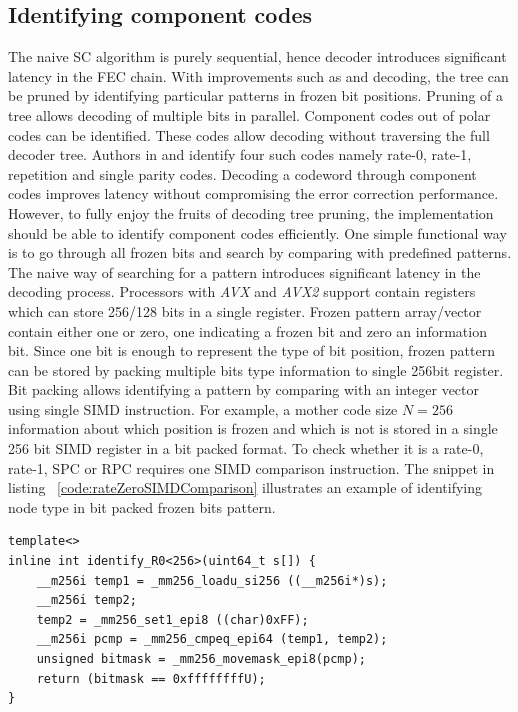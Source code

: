 \subsection{Identifying component codes}
The naive SC algorithm is purely sequential, hence decoder introduces significant latency in the FEC chain. With improvements such as \cite{fastSSC} and \cite{SSC} decoding, the tree can be pruned by identifying particular patterns in frozen bit positions. Pruning of a tree allows decoding of multiple bits in parallel. Component codes out of polar codes can be identified. These codes allow decoding without traversing the full decoder tree. Authors in \cite{SSC} and \cite{fastSSC} identify four such codes namely rate-0, rate-1, repetition and single parity codes. Decoding a codeword through component codes improves latency without compromising the error correction performance. However, to fully enjoy the fruits of decoding tree pruning, the implementation should be able to identify component codes efficiently. One simple functional way is to go through all frozen bits and search by comparing with predefined patterns. The naive way of searching for a pattern introduces significant latency in the decoding process. Processors with \textit{AVX} and \textit{AVX2} support contain registers which can store 256/128 bits in a single register. Frozen pattern array/vector contain either one or zero, one indicating a frozen bit and zero an information bit. Since one bit is enough to represent the type of bit position, frozen pattern can be stored by packing multiple bits type information to single 256bit register. Bit packing allows identifying a pattern by comparing with an integer vector using single SIMD instruction. For example, a mother code size $N=256$ information about which position is frozen and which is not is stored in a single 256 bit SIMD register in a bit packed format. To check whether it is a rate-0, rate-1, SPC or RPC requires one SIMD comparison instruction. The snippet in listing ~\ref{code:rateZeroSIMDComparison} illustrates an example of identifying node type in bit packed frozen bits pattern.
\begin{code}
	\label{code:rateZeroSIMDComparison}
	\begin{verbatim}
template<>
inline int identify_R0<256>(uint64_t s[]) {
	__m256i temp1 = _mm256_loadu_si256 ((__m256i*)s);
	__m256i temp2;
	temp2 = _mm256_set1_epi8 ((char)0xFF);
	__m256i pcmp = _mm256_cmpeq_epi64 (temp1, temp2);
	unsigned bitmask = _mm256_movemask_epi8(pcmp);
	return (bitmask == 0xffffffffU);
}
\end{verbatim}
\end{code}

